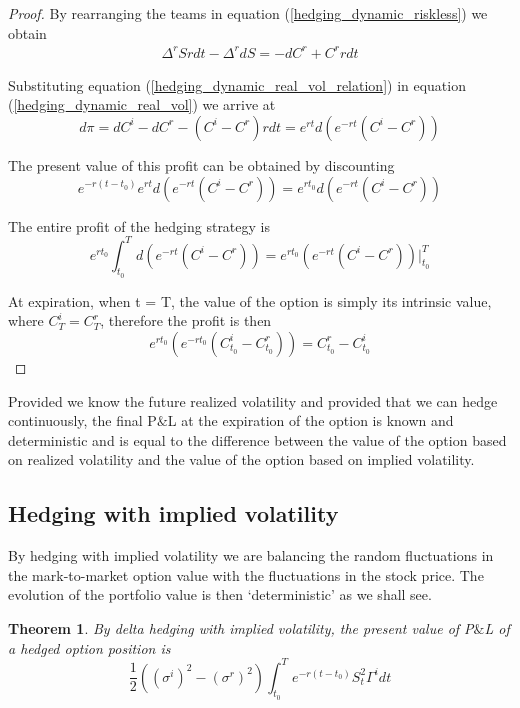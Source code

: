 \documentclass[10pt]{article}
\theoremstyle{plain}
\newtheorem{theorem}{Theorem}[section]
\numberwithin{equation}{section}
\numberwithin{table}{section}
\newcommand{\s}{\sigma}
\newcommand{\prt}[1]{\left( #1 \right)}  %
\begin{document}
\begin{proof}
    By rearranging the teams in equation (\ref{hedging_dynamic_riskless}) we obtain 
    \begin{eqnarray}
        \Delta^r S rdt  - \Delta^r dS = - dC^r + C^r rdt    
        \label{hedging_dynamic_real_vol_relation}
    \end{eqnarray} 
    
    Substituting equation (\ref{hedging_dynamic_real_vol_relation}) in equation (\ref{hedging_dynamic_real_vol}) we arrive at
    \[
        d\pi = dC^i - dC^r - (C^i -C^r)rdt   = e^{rt} d\prt{e^{-rt}(C^i - C^r)}    
    \]

    The present value of this profit can be obtained by discounting
    \[
        e^{-r(t-t_0)}e^{rt} d\prt{e^{-rt}(C^i - C^r)}  = e^{rt_0} d\prt{e^{-rt}(C^i - C^r)} 
    \] 

    The entire profit of the hedging strategy is 
    \[
        e^{rt_0} \int_{t_0}^T d\prt{e^{-rt}(C^i - C^r)} = e^{rt_0} \prt{e^{-rt}(C^i - C^r)} \left. \right|_{t_0}^T
    \]

    At expiration, when t = T, the value of the option is simply its intrinsic value, where $C^i_T=C^r_T$, therefore the profit is then 
    \[
        e^{rt_0}\prt{e^{-rt_0} (C^i_{t_0} - C^r_{t_0})} = C^r_{t_0} - C^i_{t_0}  
    \] 

\end{proof}

Provided we know the future realized
volatility and provided that we can hedge continuously, the final P$\&$L
at the expiration of the option is known and deterministic and is equal to
the difference between the value of the option based on realized volatility
and the value of the option based on implied volatility.



\subsection{Hedging with implied volatility}
By hedging with implied volatility we are balancing
the random fluctuations in the mark-to-market option value with the
fluctuations in the stock price. The evolution of the portfolio value is
then ‘deterministic’ as we shall see.


\begin{theorem}
    By delta hedging with implied volatility, the present value of P$\&$L of a hedged option position is 
    \[
        \frac{1}{2}\prt{(\s^i)^2 - (\s^r)^2 }  \int_{t_0}^T e^{-r(t-t_0)}  S^2_t \Gamma^i dt  
    \]
    \label{theorem_hedging_imp_vol}
\end{theorem}
\end{document}
